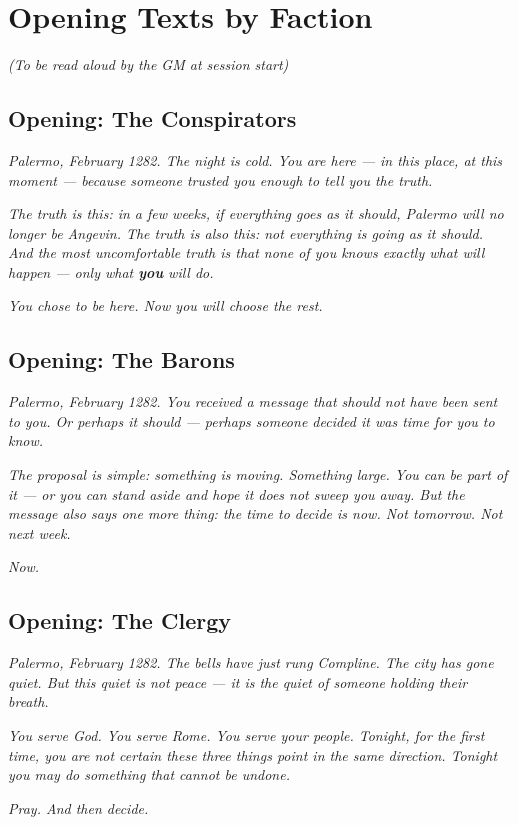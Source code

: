 \secsep

\section{Opening Texts by Faction}
\textit{(To be read aloud by the GM at session start)}

\subsection{Opening: The Conspirators}

\begin{citbox}
\textit{Palermo, February 1282. The night is cold. You are here ---
in this place, at this moment --- because someone trusted you enough
to tell you the truth.}

\textit{The truth is this: in a few weeks, if everything goes as it
should, Palermo will no longer be Angevin. The truth is also this:
not everything is going as it should. And the most uncomfortable truth
is that none of you knows exactly what will happen --- only what
\textbf{you} will do.}

\textit{You chose to be here. Now you will choose the rest.}
\end{citbox}

\subsection{Opening: The Barons}

\begin{citbox}
\textit{Palermo, February 1282. You received a message that should not
have been sent to you. Or perhaps it should --- perhaps someone decided
it was time for you to know.}

\textit{The proposal is simple: something is moving. Something large.
You can be part of it --- or you can stand aside and hope it does not
sweep you away. But the message also says one more thing: the time to
decide is now. Not tomorrow. Not next week.}

\textit{Now.}
\end{citbox}

\subsection{Opening: The Clergy}

\begin{citbox}
\textit{Palermo, February 1282. The bells have just rung Compline.
The city has gone quiet. But this quiet is not peace --- it is the
quiet of someone holding their breath.}

\textit{You serve God. You serve Rome. You serve your people. Tonight,
for the first time, you are not certain these three things point in
the same direction. Tonight you may do something that cannot be undone.}

\textit{Pray. And then decide.}
\end{citbox}

